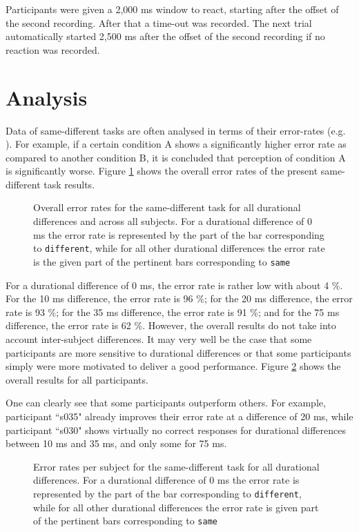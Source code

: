 Participants were given a 2,000 ms window to react, starting after the offset of the second recording. After that a time-out was recorded. The next trial automatically started 2,500 ms after the offset of the second recording if no reaction was recorded.

\section{Analysis}\label{section06_2}

Data of same-different tasks are often analysed in terms of their error-rates (e.g. \cite{Belke2002, Norris2008errorrates, Lupker2018}). For example, if a certain condition A shows a significantly higher error rate as compared to another condition B, it is concluded that perception of condition A is significantly worse. Figure \ref{fig:6_2} shows the overall error rates of the present same-different task results.

\begin{figure}
    \centering
    
    \caption{Overall error rates for the same-different task for all durational differences and across all subjects. For a durational difference of 0 ms the error rate is represented by the part of the bar corresponding to \texttt{different}, while for all other durational differences the error rate is the given part of the pertinent bars corresponding to \texttt{same}}
    \label{fig:6_2}
\end{figure}

For a durational difference of 0 ms, the error rate is rather low with about 4 \%. For the 10 ms difference, the error rate is 96 \%; for the 20 ms difference, the error rate is 93 \%; for the 35 ms difference, the error rate is 91 \%; and for the 75 ms difference, the error rate is 62 \%. However, the overall results do not take into account inter-subject differences. It may very well be the case that some participants are more sensitive to durational differences or that some participants simply were more motivated to deliver a good performance. Figure \ref{fig:6_3} shows the overall results for all participants. 

One can clearly see that some participants outperform others. For example, participant ``s035" already improves their error rate at a difference of 20 ms, while participant ``s030" shows virtually no correct responses for durational differences between 10 ms and 35 ms, and only some for 75 ms.

\begin{figure}
    \centering
    
    \caption{Error rates per subject for the same-different task for all durational differences. For a durational difference of 0 ms the error rate is represented by the part of the bar corresponding to \texttt{different}, while for all other durational differences the error rate is given part of the pertinent bars corresponding to \texttt{same}}
    \label{fig:6_3}
\end{figure}

